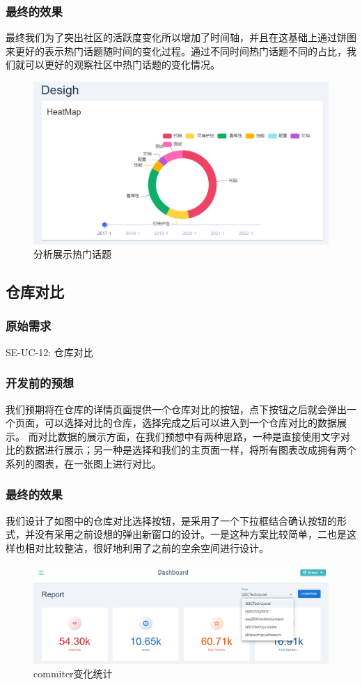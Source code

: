 \documentclass[a4paper,20pt]{article}
\begin{document}
\subsubsection{最终的效果}
最终我们为了突出社区的活跃度变化所以增加了时间轴，并且在这基础上通过饼图来更好的表示热门话题随时间的变化过程。通过不同时间热门话题不同的占比，我们就可以更好的观察社区中热门话题的变化情况。
\begin{figure}[h]
\centering
\includegraphics[scale=0.4]{pics/HeatMap.png}
\caption{分析展示热门话题}
\label{fig:1}
\end{figure}
\subsection{仓库对⽐}
\subsubsection{原始需求}
SE-UC-12: 仓库对⽐\par
\subsubsection{开发前的预想}
我们预期将在仓库的详情页面提供一个仓库对比的按钮，点下按钮之后就会弹出一个页面，可以选择对比的仓库，选择完成之后可以进入到一个仓库对比的数据展示。
而对比数据的展示方面，在我们预想中有两种思路，一种是直接使用文字对比的数据进行展示；另一种是选择和我们的主页面一样，将所有图表改成拥有两个系列的图表，在一张图上进行对比。
\subsubsection{最终的效果}
我们设计了如图中的仓库对比选择按钮，是采用了一个下拉框结合确认按钮的形式，并没有采用之前设想的弹出新窗口的设计。一是这种方案比较简单，二也是这样也相对比较整洁，很好地利用了之前的空余空间进行设计。
\begin{figure}[h]
\centering
\includegraphics[scale=0.2]{pics/compare.png}
\caption{commiter变化统计}
\label{fig:1}
\end{figure}
\end{document}
